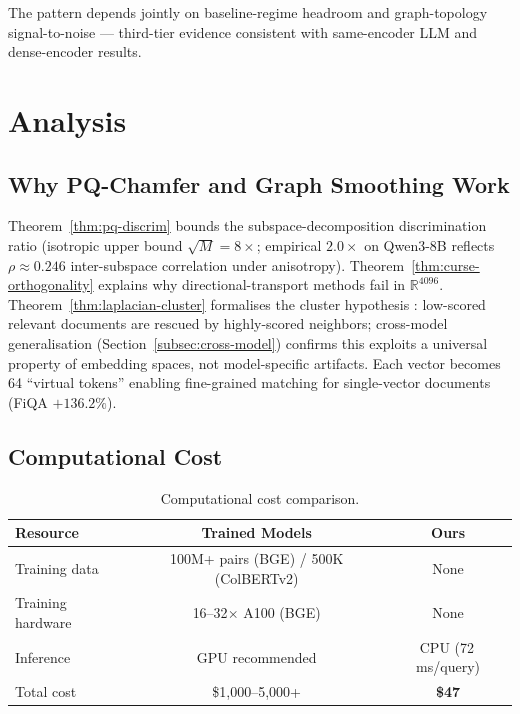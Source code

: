\documentclass[review,1p]{elsarticle}
\newcommand{\R}{\mathbb{R}}
\begin{document}
The pattern depends jointly on baseline-regime headroom and graph-topology signal-to-noise — third-tier evidence consistent with same-encoder LLM and dense-encoder results.

\section{Analysis}
\label{sec:analysis}

\subsection{Why PQ-Chamfer and Graph Smoothing Work}
\label{subsec:why-methods}

Theorem~\ref{thm:pq-discrim} bounds the subspace-decomposition discrimination ratio (isotropic upper bound $\sqrt{M}=8\times$; empirical $2.0\times$ on Qwen3-8B reflects $\rho \approx 0.246$ inter-subspace correlation under anisotropy). Theorem~\ref{thm:curse-orthogonality} explains why directional-transport methods fail in $\R^{4096}$. Theorem~\ref{thm:laplacian-cluster} formalises the cluster hypothesis \citep{vanrijsbergen1979ir}: low-scored relevant documents are rescued by highly-scored neighbors; cross-model generalisation (Section~\ref{subsec:cross-model}) confirms this exploits a universal property of embedding spaces, not model-specific artifacts. Each vector becomes 64 ``virtual tokens'' enabling fine-grained matching for single-vector documents (FiQA $+136.2\%$).

\subsection{Computational Cost}
\label{subsec:cost}

\begin{table}[ht]
\centering
\caption{Computational cost comparison.}
\label{tab:cost}
\footnotesize
\begin{tabular}{lcc}
\toprule
Resource & Trained Models & Ours \\
\midrule
Training data & 100M+ pairs (BGE) / 500K (ColBERTv2) & None \\
Training hardware & 16--32$\times$ A100 (BGE) & None \\
Inference & GPU recommended & CPU (72\,ms/query) \\
Total cost & \$1,000--5,000+ & \textbf{\$47} \\
\bottomrule
\end{tabular}
\end{table}
\end{document}
